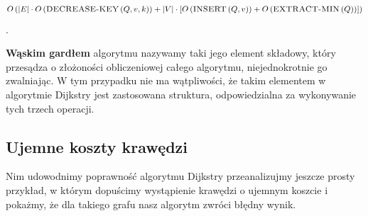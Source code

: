\begin{equation}
O \left( \left| E \right| \cdot O \left( \textrm{\textsc{DECREASE-KEY}} \left( Q, v, k \right) \right) + \left| V \right| \cdot \left[ O \left( \textrm{\textsc{INSERT}} \left( Q, v \right) \right) + O \left( \textrm{\textsc{EXTRACT-MIN}} \left( Q \right) \right) \right] \right)
\end{equation}\label{eq:dijkstraComplexity}.

\textbf{Wąskim gardłem} algorytmu nazywamy taki jego element składowy, który przesądza o złożoności obliczeniowej całego algorytmu, niejednokrotnie go zwalniając. W tym przypadku nie ma wątpliwości, że takim elementem w algorytmie Dijkstry jest zastosowana struktura, odpowiedzialna za wykonywanie tych trzech operacji.

\subsection{Ujemne koszty krawędzi}

Nim udowodnimy poprawność algorytmu Dijkstry przeanalizujmy jeszcze prosty przykład, w którym dopuścimy wystąpienie krawędzi o ujemnym koszcie i pokażmy, że dla takiego grafu nasz algorytm zwróci błędny wynik.

